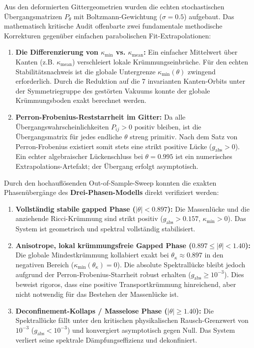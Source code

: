 \documentclass[11pt,a4paper]{article}
\begin{document}
	Aus den deformierten Gittergeometrien wurden die echten stochastischen Übergangsmatrizen $P_\theta$ mit Boltzmann-Gewichtung ($\sigma = 0.5$) aufgebaut. Das mathematisch kritische Audit offenbarte zwei fundamentale methodische Korrekturen gegenüber einfachen parabolischen Fit-Extrapolationen:
	\begin{enumerate}
		\item \textbf{Die Differenzierung von $\kappa_{\min}$ vs. $\kappa_{\text{mean}}$:} Ein einfacher Mittelwert über Kanten (z.B. $\kappa_{\text{mean}}$) verschleiert lokale Krümmungseinbrüche. Für den echten Stabilitätsnachweis ist die globale Untergrenze $\kappa_{\min}(\theta)$ zwingend erforderlich. Durch die Reduktion auf die 7 invarianten Kanten-Orbits unter der Symmetriegruppe des gestörten Vakuums konnte der globale Krümmungsboden exakt berechnet werden.
		\item \textbf{Perron-Frobenius-Reststarrheit im Gitter:} Da alle Übergangswahrscheinlichkeiten $P_{ij} > 0$ positiv bleiben, ist die Übergangsmatrix für jedes endliche $\theta$ streng primitiv. Nach dem Satz von Perron-Frobenius existiert somit stets eine strikt positive Lücke ($g_{\text{abs}} > 0$). Ein echter algebraischer Lückenschluss bei $\theta = 0.995$ ist ein numerisches Extrapolations-Artefakt; der Übergang erfolgt asymptotisch.
	\end{enumerate}
	
	Durch den hochauflösenden Out-of-Sample-Sweep konnten die exakten Phasenübergänge des \textbf{Drei-Phasen-Modells} direkt verifiziert werden:
	\begin{enumerate}
		\item \textbf{Vollständig stabile gapped Phase ($|\theta| < 0.897$):} Die Massenlücke und die anziehende Ricci-Krümmung sind strikt positiv ($g_{\text{abs}} > 0.157$, $\kappa_{\min} > 0$). Das System ist geometrisch und spektral vollständig stabilisiert.
		\item \textbf{Anisotrope, lokal krümmungsfreie Gapped Phase ($0.897 \le |\theta| < 1.40$):} Die globale Mindestkrümmung kollabiert exakt bei $\theta_\kappa \approx 0.897$ in den negativen Bereich ($\kappa_{\min}(\theta_\kappa) = 0$). Die absolute Spektrallücke bleibt jedoch aufgrund der Perron-Frobenius-Starrheit robust erhalten ($g_{\text{abs}} \ge 10^{-3}$). Dies beweist rigoros, dass eine positive Transportkrümmung hinreichend, aber nicht notwendig für das Bestehen der Massenlücke ist.
		\item \textbf{Deconfinement-Kollaps / Masselose Phase ($|\theta| \ge 1.40$):} Die Spektrallücke fällt unter den kritischen physikalischen Rausch-Grenzwert von $10^{-3}$ ($g_{\text{abs}} < 10^{-3}$) und konvergiert asymptotisch gegen Null. Das System verliert seine spektrale Dämpfungseffizienz und dekonfiniert.
	\end{enumerate}
	
\end{document}
